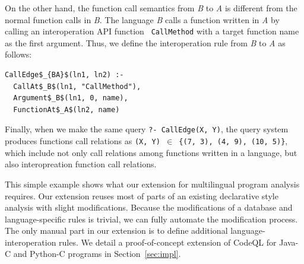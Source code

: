 \noindent
On the other hand, the function call semantics from {\it B} to {\it A} is
different from the normal function calls in {\it B}. The language {\it B} calls
a function written in {\it A} by calling an interoperation API function {\tt
CallMethod} with a target function name as the first argument. Thus, we define
the interoperation rule from {\it B} to {\it A} as follows: 


\begin{lstlisting}
CallEdge$_{BA}$(ln1, ln2) :-
  CallAt$_B$(ln1, "CallMethod"),
  Argument$_B$(ln1, 0, name),
  FunctionAt$_A$(ln2, name)
\end{lstlisting}

%

Finally, when we make the same query {\tt ?- CallEdge(X, Y)}, the query system
produces functions call relations as {\tt (X, Y) $\in$ \{(7, 3), (4, 9), (10,
5)\}}, which include not only call relations among functions written in a
language, but also interopreation function call relations. 

This simple example shows what our extension for multilingual program analysis
requires. Our extension reuses most of parts of an existing declarative style
analysis with slight modifications. Because the modifications of a database and
language-specific rules is trivial, we can fully automate the modification
process.  The only manual part in our extension is to define additional
language-interoperation rules. We detail a proof-of-concept extension of CodeQL
for Java-C and Python-C programs in Section~\ref{sec:impl}.


